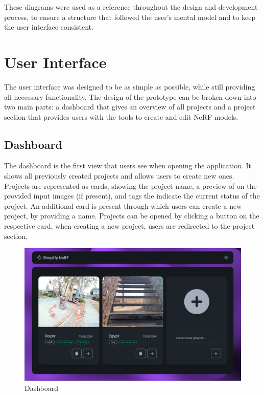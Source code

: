 These diagrams were used as a reference throughout the design and development process, to ensure a structure that followed the user's mental model and to keep the user interface consistent.

\section{User Interface}

The user interface was designed to be as simple as possible, while still providing all necessary functionality. 
The design of the prototype can be broken down into two main parts: a dashboard that gives an overview of all projects and a project section that provides users with the tools to create and edit NeRF models.

\subsection{Dashboard}

The dashboard is the first view that users see when opening the application. It shows all previously created projects and allows users to create new ones. 
Projects are represented as cards, showing the project name, a preview of on the provided input images (if present), and tags the indicate the current status of the project.
An additional card is present through which users can create a new project, by providing a name.
Projects can be opened by clicking a button on the respective card, when creating a new project, users are redirected to the project section.

\begin{figure}[htb]
  \includegraphics[width=\textwidth]{figures/view-overview.png}
  \caption{Dashboard}
  \label{fig:design:dashboard}
\end{figure}

